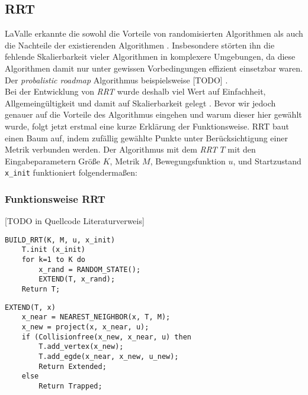 \subsection{RRT}
LaValle erkannte die sowohl die Vorteile von randomisierten Algorithmen als auch die Nachteile der existierenden Algorithmen \citep[vlg. Kap 1][]{Lav98}. Insbesondere störten ihn die fehlende Skalierbarkeit vieler Algorithmen in komplexere Umgebungen, da diese Algorithmen damit nur unter gewissen Vorbedingungen effizient einsetzbar waren. Der \textit{probalistic roadmap} Algorithmus \citep{AmWu96} beispielsweise [TODO] .\\
Bei der Entwicklung von \textit{RRT} wurde deshalb viel Wert auf Einfachheit, Allgemeingültigkeit und damit auf Skalierbarkeit gelegt \citep[vlg. Kap 3][]{Lav98}. Bevor wir jedoch genauer auf die Vorteile des Algorithmus eingehen und warum dieser hier gewählt wurde, folgt jetzt erstmal eine kurze Erklärung der Funktionsweise. RRT baut einen Baum auf, indem zufällig gewählte Punkte unter Berücksichtigung einer Metrik verbunden werden. Der Algorithmus mit dem \textit{RRT} $T$ mit den Eingabeparametern Größe $K$, Metrik $M$, Bewegungsfunktion $u$, und Startzustand \verb|x_init|  funktioniert folgendermaßen:

\subsubsection{Funktionsweise RRT}
[TODO in Quellcode Literaturverweis]
\lstset{language=Pascal, stepnumber=1, numbers=left}
\begin{lstlisting}
BUILD_RRT(K, M, u, x_init)
	T.init (x_init)
	for k=1 to K do
		x_rand = RANDOM_STATE();
		EXTEND(T, x_rand);
	Return T;
\end{lstlisting}
\begin{lstlisting}
EXTEND(T, x)
	x_near = NEAREST_NEIGHBOR(x, T, M);
	x_new = project(x, x_near, u);
	if (Collisionfree(x_new, x_near, u) then
		T.add_vertex(x_new);
		T.add_egde(x_near, x_new, u_new);
		Return Extended;
	else
		Return Trapped;
\end{lstlisting}


